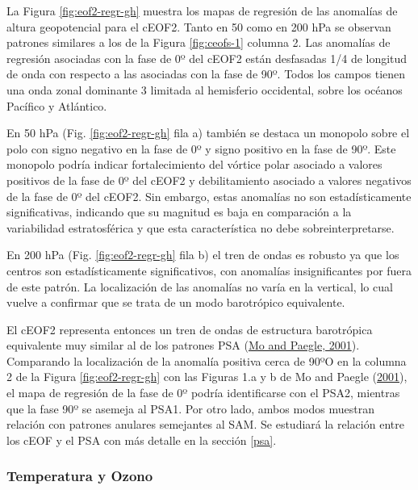\documentclass[12pt,oneside,a4paper]{reedthesis}
\begin{document}
La Figura \ref{fig:eof2-regr-gh} muestra los mapas de regresión de las anomalías de altura geopotencial para el cEOF2.
Tanto en 50 como en 200 hPa se observan patrones similares a los de la Figura \ref{fig:ceofs-1} columna 2.
Las anomalías de regresión asociadas con la fase de 0º del cEOF2 están desfasadas 1/4 de longitud de onda con respecto a las asociadas con la fase de 90º.
Todos los campos tienen una onda zonal dominante 3 limitada al hemisferio occidental, sobre los océanos Pacífico y Atlántico.

En 50 hPa (Fig. \ref{fig:eof2-regr-gh} fila a) también se destaca un monopolo sobre el polo con signo negativo en la fase de 0º y signo positivo en la fase de 90º.
Este monopolo podría indicar fortalecimiento del vórtice polar asociado a valores positivos de la fase de 0º del cEOF2 y debilitamiento asociado a valores negativos de la fase de 0º del cEOF2.
Sin embargo, estas anomalías no son estadísticamente significativas, indicando que su magnitud es baja en comparación a la variabilidad estratosférica y que esta característica no debe sobreinterpretarse.

En 200 hPa (Fig. \ref{fig:eof2-regr-gh} fila b) el tren de ondas es robusto ya que los centros son estadísticamente significativos, con anomalías insignificantes por fuera de este patrón.
La localización de las anomalías no varía en la vertical, lo cual vuelve a confirmar que se trata de un modo barotrópico equivalente.

El cEOF2 representa entonces un tren de ondas de estructura barotrópica equivalente muy similar al de los patrones PSA (\protect\hyperlink{ref-mo2001}{Mo and Paegle, 2001}).
Comparando la localización de la anomalía positiva cerca de 90ºO en la columna 2 de la Figura \ref{fig:eof2-regr-gh} con las Figuras 1.a y b de Mo and Paegle (\protect\hyperlink{ref-mo2001}{2001}), el mapa de regresión de la fase de 0º podría identificarse con el PSA2, mientras que la fase 90º se asemeja al PSA1.
Por otro lado, ambos modos muestran relación con patrones anulares semejantes al SAM.
Se estudiará la relación entre los cEOF y el PSA con más detalle en la sección \ref{psa}.

\hypertarget{temperatura-y-ozono}{%
\subsubsection{Temperatura y Ozono}\label{temperatura-y-ozono}}
\end{document}
